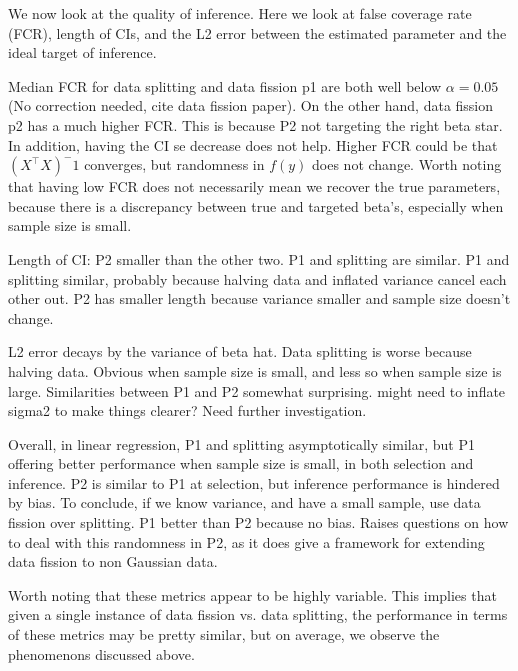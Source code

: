 We now look at the quality of inference. Here we look at false coverage rate (FCR), length of CIs, and the L2 error between the estimated parameter and the ideal target of inference.

Median FCR for data splitting and data fission p1 are both well below $\alpha = 0.05$ (No correction needed, cite data fission paper). On the other hand, data fission p2 has a much higher FCR. This is because P2 not targeting the right beta star. In addition, having the CI se decrease does not help. Higher FCR could be that $(X^\top X)^-1$ converges, but randomness in $f(y)$ does not change. Worth noting that having low FCR does not necessarily mean we recover the true parameters, because there is a discrepancy between true and targeted beta's, especially when sample size is small.

Length of CI: P2 smaller than the other two. P1 and splitting are similar. P1 and splitting similar, probably because halving data and inflated variance cancel each other out. P2 has smaller length because variance smaller and sample size doesn't change.

L2 error decays by the variance of beta hat. Data splitting is worse because halving data. Obvious when sample size is small, and less so when sample size is large. Similarities between P1 and P2 somewhat surprising. might need to inflate sigma2 to make things clearer? Need further investigation.


Overall, in linear regression, P1 and splitting asymptotically similar, but P1 offering better performance when sample size is small, in both selection and inference. P2 is similar to P1 at selection, but inference performance is hindered by bias. To conclude, if we know variance, and have a small sample, use data fission over splitting. P1 better than P2 because no bias. Raises questions on how to deal with this randomness in P2, as it does give a framework for extending data fission to non Gaussian data.

Worth noting that these metrics appear to be highly variable. This implies that given a single instance of data fission vs. data splitting, the performance in terms of these metrics may be pretty similar, but on average, we observe the phenomenons discussed above.

